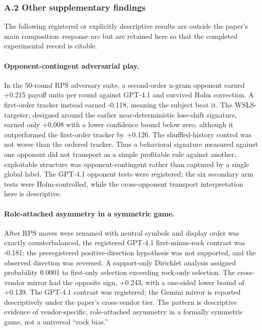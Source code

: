 \documentclass[
  11pt]{article}
\begin{document}
\subsubsection{A.2 Other supplementary
findings}\label{a.2-other-supplementary-findings}

The following registered or explicitly descriptive results are outside
the paper's main composition--response arc but are retained here so that
the completed experimental record is citable.

\paragraph{Opponent-contingent adversarial play.}
In the 50-round RPS adversary suite, a second-order n-gram opponent earned
+0.215 payoff units per round against GPT-4.1 and survived Holm correction.
A first-order tracker instead earned -0.118, meaning the subject beat it.
The WSLS-targeter, designed around the earlier near-deterministic
lose-shift signature, earned only +0.008 with a lower confidence bound
below zero, although it outperformed the first-order tracker by +0.126.
The shuffled-history control was not worse than the ordered tracker. Thus
a behavioral signature measured against one opponent did not transport as
a simple profitable rule against another; exploitable structure was
opponent-contingent rather than captured by a single global label. The
GPT-4.1 opponent tests were registered; the six secondary arm tests were
Holm-controlled, while the cross-opponent transport interpretation here is
descriptive.

\paragraph{Role-attached asymmetry in a symmetric game.}
After RPS moves were renamed with neutral symbols and display order was
exactly counterbalanced, the registered GPT-4.1 first-minus-rock contrast
was -0.181: the preregistered positive-direction hypothesis was not
supported, and the observed direction was reversed. A support-only
Dirichlet analysis assigned probability 0.0001 to first-only selection
exceeding rock-only selection. The cross-vendor mirror had the opposite
sign, +0.243, with a one-sided lower bound of +0.139. The GPT-4.1 contrast
was registered; the Gemini mirror is reported descriptively under the
paper's cross-vendor tier. The pattern is descriptive evidence of
vendor-specific, role-attached asymmetry in a formally symmetric game,
not a universal ``rock bias.''
\end{document}
